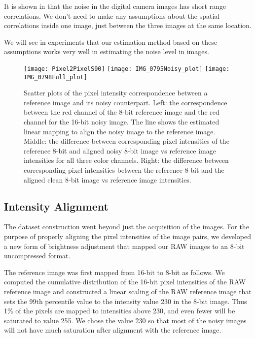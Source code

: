 \documentclass[review]{elsarticle}
\begin{document}
 It is shown in \cite{NoiseEstimation} that the noise in the digital camera images has short range correlations. 
 We don't need to make any assumptions about the spatial correlations inside one image, just between the three images at the same location.
 
 We will see in experiments that our estimation method based on these assumptions works very well in estimating the noise level in images.
\begin{figure*}[t]
\centering
\hskip -1mm
\texttt{[image: Pixel2PixelS90]}
\hskip -1mm
\texttt{[image: IMG\_0795Noisy\_plot]}
\hskip -1mm
\texttt{[image: IMG\_0798Full\_plot]}
\vskip -3mm
\caption{Scatter plots of the pixel intensity correspondence between a reference image and its noisy counterpart. Left: the correspondence between the red channel of the 8-bit reference image and the red channel for the 16-bit noisy image. The line shows the estimated linear mapping to align the noisy image to the reference image. Middle: the difference between corresponding pixel intensities of the reference 8-bit and aligned noisy 8-bit image vs reference image intensities for all three color channels. Right: the difference between corresponding pixel intensities between the reference 8-bit and the aligned clean 8-bit image vs reference image intensities. }
\label{fig:pixelcorrespondence}
\vspace{-4mm}
\end{figure*}
\subsection{Intensity Alignment} \label{sec:alignment}


The dataset construction went beyond just the acquisition of the images. For the purpose of properly aligning the pixel intensities of the image pairs, we developed a new form of brightness adjustment that mapped our RAW images to an 8-bit uncompressed format. 

The reference image was first mapped from 16-bit to 8-bit as follows. We computed the cumulative distribution of the 16-bit pixel intensities of the RAW reference image and constructed a linear scaling of the RAW reference image that sets the 99th percentile value to the intensity value 230 in the 8-bit image. Thus 1\% of the pixels are mapped to intensities above 230, and even fewer will be saturated to value 255. We chose the value 230 so that most of the noisy images will not have much saturation after alignment with the reference image.
\end{document}
